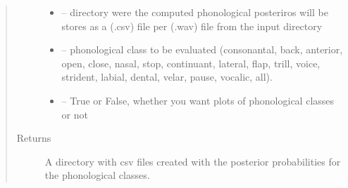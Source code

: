 \documentclass[letterpaper,10pt,english]{sphinxmanual}
\begin{document}
\begin{fulllineitems}
\begin{fulllineitems}
\begin{quote}
\begin{description}
\begin{itemize}
\item {} 
 -- directory were the computed phonological posteriros will be stores as a (.csv) file per (.wav) file from the input directory

\item {} 
 -- phonological class to be evaluated (\sphinxquotedblleft{}consonantal\sphinxquotedblright{}, \sphinxquotedblleft{}back\sphinxquotedblright{}, \sphinxquotedblleft{}anterior\sphinxquotedblright{}, \sphinxquotedblleft{}open\sphinxquotedblright{}, \sphinxquotedblleft{}close\sphinxquotedblright{}, \sphinxquotedblleft{}nasal\sphinxquotedblright{}, \sphinxquotedblleft{}stop\sphinxquotedblright{},
\sphinxquotedblleft{}continuant\sphinxquotedblright{},  \sphinxquotedblleft{}lateral\sphinxquotedblright{}, \sphinxquotedblleft{}flap\sphinxquotedblright{}, \sphinxquotedblleft{}trill\sphinxquotedblright{}, \sphinxquotedblleft{}voice\sphinxquotedblright{}, \sphinxquotedblleft{}strident\sphinxquotedblright{},
\sphinxquotedblleft{}labial\sphinxquotedblright{}, \sphinxquotedblleft{}dental\sphinxquotedblright{}, \sphinxquotedblleft{}velar\sphinxquotedblright{}, \sphinxquotedblleft{}pause\sphinxquotedblright{}, \sphinxquotedblleft{}vocalic\sphinxquotedblright{}, \sphinxquotedblleft{}all\sphinxquotedblright{}).

\item {} 
 -- True or False, whether you want plots of phonological classes or not

\end{itemize}

\item[{Returns}] \leavevmode
A directory with csv files created with the posterior probabilities for the phonological classes.

\end{description}\end{quote}


\end{fulllineitems}
\end{fulllineitems}
\end{document}

